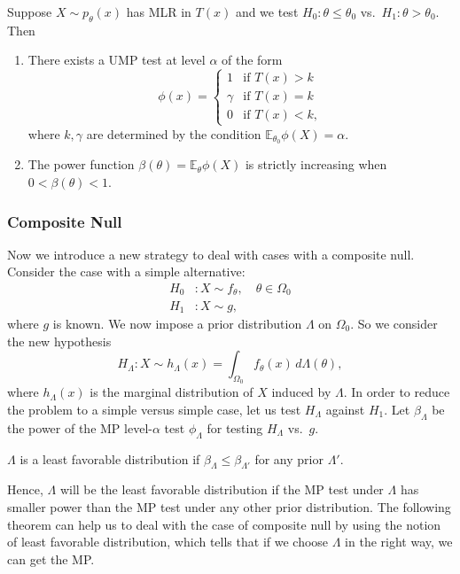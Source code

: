 \begin{thm}
Suppose $X \sim p_\theta(x)$ has MLR in $T(x)$ and we test $H_0 : \theta \le \theta_0$ 
vs.\ $H_1 : \theta > \theta_0$. Then
\begin{enumerate}
  \item[(i)] There exists a UMP test at level $\alpha$ of the form
  \[
    \phi(x) = \begin{cases}
      1      & \text{if } T(x) > k \\
      \gamma & \text{if } T(x) = k \\
      0      & \text{if } T(x) < k,
    \end{cases}
  \]
  where $k, \gamma$ are determined by the condition 
  $\mathbb{E}_{\theta_0}\phi(X) = \alpha$.
  \item[(ii)] The power function $\beta(\theta) = \mathbb{E}_\theta \phi(X)$ is 
  strictly increasing when $0 < \beta(\theta) < 1$.
\end{enumerate}
\end{thm}

\subsubsection{Composite Null}
Now we introduce a new strategy to deal with cases with a composite null.
Consider the case with a simple alternative:
\[
  \begin{aligned}
    H_0 &: X \sim f_\theta, \quad \theta \in \Omega_0 \\
    H_1 &: X \sim g,
  \end{aligned}
\]
where $g$ is known. We now impose a prior distribution $\Lambda$ on $\Omega_0$. So 
we consider the new hypothesis
\[
  H_\Lambda : X \sim h_\Lambda(x) = \int_{\Omega_0} f_\theta(x)\, d\Lambda(\theta),
\]
where $h_\Lambda(x)$ is the marginal distribution of $X$ induced by $\Lambda$. In 
order to reduce the problem to a simple versus simple case, let us test $H_\Lambda$ against $H_1$.
Let $\beta_\Lambda$ be the power of the MP level-$\alpha$ test $\phi_\Lambda$ for 
testing $H_\Lambda$ vs.\ $g$.

\begin{defn}
$\Lambda$ is a least favorable distribution if $\beta_\Lambda \le \beta_{\Lambda'}$ 
for any prior $\Lambda'$.
\end{defn}

Hence, $\Lambda$ will be the least favorable distribution if the MP test under 
$\Lambda$ has smaller power than the MP test under any other prior distribution. 
The following theorem can help us to deal with the case of composite null by using 
the notion of least favorable distribution, which tells that if we choose $\Lambda$ 
in the right way, we can get the MP.


